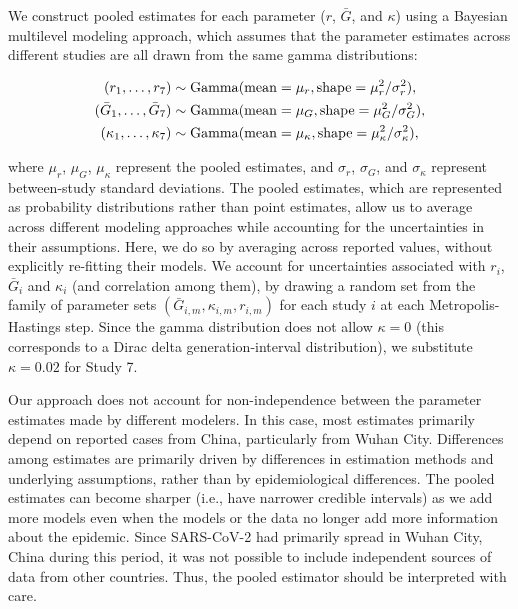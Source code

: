 \documentclass[12pt]{article}
\begin{document}
We construct pooled estimates for each parameter ($r$, $\bar G$, and $\kappa$) using a Bayesian multilevel modeling approach, which assumes that the parameter estimates across different studies are all drawn from the same gamma distributions:
\begin{linenomath*}
\begin{equation}
\begin{aligned}
(r_1, \dots, r_7) &\sim \mathrm{Gamma}(\mathrm{mean}=\mu_r, \mathrm{shape}=\mu_r^2/\sigma_r^2),\\
(\bar{G}_1, \dots, \bar{G}_7) &\sim \mathrm{Gamma}(\mathrm{mean}=\mu_G, \mathrm{shape}=\mu_G^2/\sigma_G^2),\\
(\kappa_1, \dots, \kappa_7) &\sim \mathrm{Gamma}(\mathrm{mean}=\mu_\kappa, \mathrm{shape}=\mu_\kappa^2/\sigma_\kappa^2),\\
\end{aligned}
\end{equation}
\end{linenomath*}
where $\mu_r$, $\mu_G$, $\mu_\kappa$ represent the pooled estimates, and $\sigma_r$, $\sigma_G$, and $\sigma_\kappa$ represent between-study standard deviations.
The pooled estimates, which are represented as probability distributions rather than point estimates, allow us to average across different modeling approaches while accounting for the uncertainties in their assumptions.
Here, we do so by averaging across reported values, without explicitly re-fitting their models.
We account for uncertainties associated with $r_i$, $\bar G_i$ and $\kappa_i$ (and correlation among them), by drawing a random set from the family of parameter sets $(\bar{G}_{i,m}, \kappa_{i,m}, r_{i,m})$ for each study $i$ at each Metropolis-Hastings step.
Since the gamma distribution does not allow $\kappa=0$ (this corresponds to a Dirac delta generation-interval distribution), we substitute $\kappa=0.02$ for Study 7.

Our approach does not account for non-independence between the parameter estimates made by different modelers.
In this case, most estimates primarily depend on reported cases from China, particularly from Wuhan City.
Differences among estimates are primarily driven by differences in estimation methods and underlying assumptions, rather than by epidemiological differences.
The pooled estimates can become sharper (i.e., have narrower credible intervals) as we add more models even when the models or the data no longer add more information about the epidemic.
Since SARS-CoV-2 had primarily spread in Wuhan City, China during this period, it was not possible to include independent sources of data from other countries.
Thus, the pooled estimator should be interpreted with care.
\end{document}
